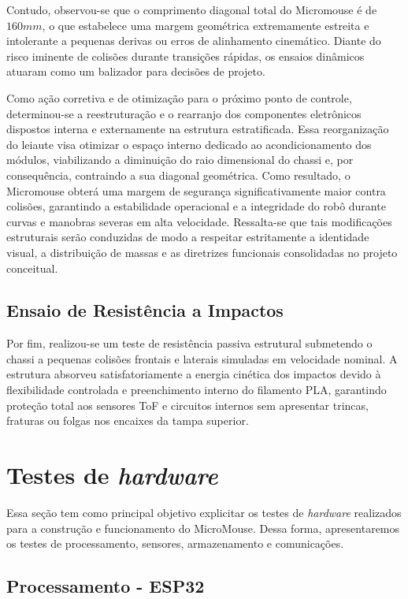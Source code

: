 Contudo, observou-se que o comprimento diagonal total do Micromouse é de $160 mm$, o que estabelece uma margem geométrica extremamente estreita e intolerante a pequenas derivas ou erros de alinhamento cinemático. Diante do risco iminente de colisões durante transições rápidas, os ensaios dinâmicos atuaram como um balizador para decisões de projeto. 

Como ação corretiva e de otimização para o próximo ponto de controle, determinou-se a reestruturação e o rearranjo dos componentes eletrônicos dispostos interna e externamente na estrutura estratificada. Essa reorganização do leiaute visa otimizar o espaço interno dedicado ao acondicionamento dos módulos, viabilizando a diminuição do raio dimensional do chassi e, por consequência, contraindo a sua diagonal geométrica. Como resultado, o Micromouse obterá uma margem de segurança significativamente maior contra colisões, garantindo a estabilidade operacional e a integridade do robô durante curvas e manobras severas em alta velocidade. Ressalta-se que tais modificações estruturais serão conduzidas de modo a respeitar estritamente a identidade visual, a distribuição de massas e as diretrizes funcionais consolidadas no projeto conceitual.

\subsection{Ensaio de Resistência a Impactos}
Por fim, realizou-se um teste de resistência passiva estrutural submetendo o chassi a pequenas colisões frontais e laterais simuladas em velocidade nominal. A estrutura absorveu satisfatoriamente a energia cinética dos impactos devido à flexibilidade controlada e preenchimento interno do filamento PLA, garantindo proteção total aos sensores ToF e circuitos internos sem apresentar trincas, fraturas ou folgas nos encaixes da tampa superior.

\section{Testes de \textit{hardware}}

Essa seção tem como principal objetivo explicitar os testes de \textit{hardware} realizados para a construção e funcionamento do MicroMouse. Dessa forma, apresentaremos os testes de processamento, sensores, armazenamento e comunicações.

\subsection{Processamento - ESP32}

